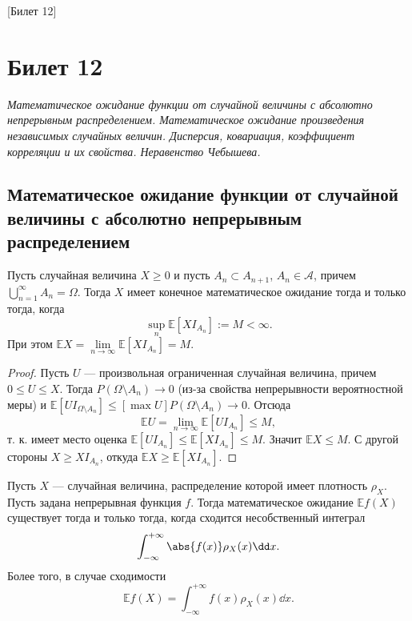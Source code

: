 [Билет 12]

\section{Билет 12}

\begin{center}
    \it Математическое ожидание функции от случайной величины с абсолютно непрерывным распределением.
    Математическое ожидание произведения независимых случайных величин.
    Дисперсия, ковариация, коэффициент корреляции и их свойства.
    Неравенство Чебышева.
\end{center}

\sectionbreak
\subsection{Математическое ожидание функции от случайной величины с абсолютно непрерывным распределением}

\begin{lemma}\label{key-lemma}
    Пусть случайная величина $X \geqslant 0$ и пусть $A_n \subset A_{n + 1}$, $A_n \in \mathcal{A}$, причем $\bigcup\limits_{n = 1}^\infty A_n = \Omega$.
    Тогда $X$ имеет конечное математическое ожидание тогда и только тогда, когда
    \[
        \sup\limits_{n}\mathbb{E}[X I_{A_n}] := M < \infty.
    \]
    При этом $\mathbb{E} X = \lim\limits_{n \to \infty}\mathbb{E}[X I_{A_n}] = M$.
\end{lemma}

\begin{proof}
    Пусть $U$ --- произвольная ограниченная случайная величина, причем $0 \leqslant U \leqslant X$.
    Тогда $P(\Omega \setminus A_n) \to 0$ (из-за свойства непрерывности вероятностной меры) и $\mathbb{E}[U I_{\Omega \setminus A_n}] \leqslant [\max U] P(\Omega \setminus A_n) \to 0$.
    Отсюда
    \[
        \mathbb{E} U = \lim\limits_{n \to \infty}\mathbb{E}[U I_{A_n}] \leqslant M,
    \]
    т. к. имеет место оценка $\mathbb{E}[U I_{A_n}] \leqslant \mathbb{E}[X I_{A_n}] \leqslant M$.
    Значит $\mathbb{E} X \leqslant M$.
    С другой стороны $X \geqslant X I_{A_n}$, откуда $\mathbb{E}X \geqslant \mathbb{E}[X I_{A_n}]$.
\end{proof}


\begin{proposal*}
    Пусть $X$ --- случайная величина, распределение которой имеет плотность $\rho_X$.
    Пусть задана непрерывная функция $f$.
    Тогда математическое ожидание $\mathbb{E}f(X)$ существует тогда и только тогда, когда сходится несобственный интеграл
    \[
        \int_{-\infty}^{+\infty}\abs{f(x)} \rho_{X}(x) \dd x.
    \]
    Более того, в случае сходимости
    \[
        \mathbb{E}f(X) = \int_{-\infty}^{+\infty} f(x) \rho_{X}(x) \dd x.
    \]
\end{proposal*}

